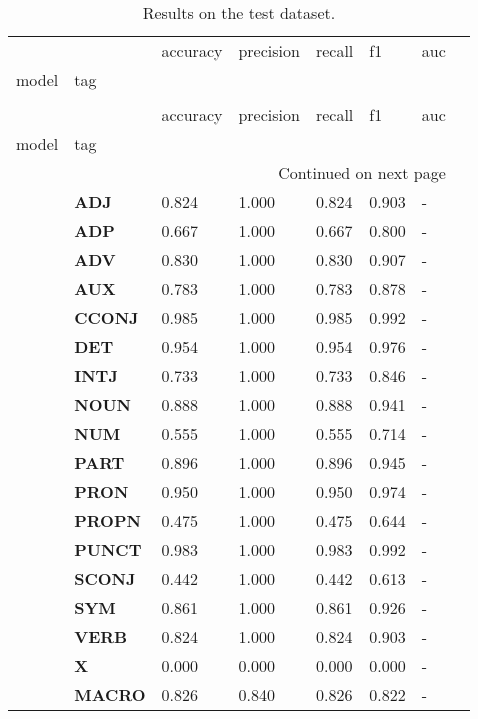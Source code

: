\begin{longtable}{|l||l||l||l||l||l||l||l|}
\caption{Results on the test dataset.} \label{tab::ex_2_test} \\
\toprule
 &  & accuracy & precision & recall & f1 & auc \\
model & tag &  &  &  &  &  \\
\midrule
\endfirsthead
\caption[]{Results on the test dataset.} \\
\toprule
 &  & accuracy & precision & recall & f1 & auc \\
model & tag &  &  &  &  &  \\
\midrule
\endhead
\midrule
\multicolumn{7}{r}{Continued on next page} \\
\midrule
\endfoot
\bottomrule
\endlastfoot
\multirow[t]{18}{*}{\textbf{Baseline}} & \textbf{ADJ} & 0.824 & 1.000 & 0.824 & 0.903 & - \\
\textbf{} & \textbf{ADP} & 0.667 & 1.000 & 0.667 & 0.800 & - \\
\textbf{} & \textbf{ADV} & 0.830 & 1.000 & 0.830 & 0.907 & - \\
\textbf{} & \textbf{AUX} & 0.783 & 1.000 & 0.783 & 0.878 & - \\
\textbf{} & \textbf{CCONJ} & 0.985 & 1.000 & 0.985 & 0.992 & - \\
\textbf{} & \textbf{DET} & 0.954 & 1.000 & 0.954 & 0.976 & - \\
\textbf{} & \textbf{INTJ} & 0.733 & 1.000 & 0.733 & 0.846 & - \\
\textbf{} & \textbf{NOUN} & 0.888 & 1.000 & 0.888 & 0.941 & - \\
\textbf{} & \textbf{NUM} & 0.555 & 1.000 & 0.555 & 0.714 & - \\
\textbf{} & \textbf{PART} & 0.896 & 1.000 & 0.896 & 0.945 & - \\
\textbf{} & \textbf{PRON} & 0.950 & 1.000 & 0.950 & 0.974 & - \\
\textbf{} & \textbf{PROPN} & 0.475 & 1.000 & 0.475 & 0.644 & - \\
\textbf{} & \textbf{PUNCT} & 0.983 & 1.000 & 0.983 & 0.992 & - \\
\textbf{} & \textbf{SCONJ} & 0.442 & 1.000 & 0.442 & 0.613 & - \\
\textbf{} & \textbf{SYM} & 0.861 & 1.000 & 0.861 & 0.926 & - \\
\textbf{} & \textbf{VERB} & 0.824 & 1.000 & 0.824 & 0.903 & - \\
\textbf{} & \textbf{X} & 0.000 & 0.000 & 0.000 & 0.000 & - \\
\textbf{} & \textbf{MACRO} & 0.826 & 0.840 & 0.826 & 0.822 & - \\

\end{longtable}
